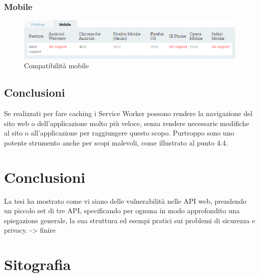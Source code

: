 \documentclass[11pt ,a4paper , twoside , openright ]{article}
\begin{document}
\subsubsection{Mobile}
\begin{figure}[h]
	\centering
	\includegraphics[width=1\linewidth]{CompMobile}
	\caption{Compatibilità mobile}
	\label{fig:Compatibilità mobile}
\end{figure}
\subsection{Conclusioni}
Se realizzati per fare caching i Service Worker possono rendere la navigazione del sito web o dell'applicazione molto più veloce, senza rendere necessarie modifiche al sito o all'applicazione per raggiungere questo scopo. 
Purtroppo sono uno potente strumento anche per scopi malevoli, come illustrato al punto 4.4.
\newpage
\cleardoublepage
\section{Conclusioni}
La tesi ha mostrato come vi siano delle vulnerabilità nelle API web, prendendo un piccolo set di tre API, specificando per ognuna in modo approfondito una spiegazione generale, la sua struttura ed esempi pratici sui problemi di sicurezza e privacy.
-> finire 

\cleardoublepage
\listoffigures
\cleardoublepage
\section{Sitografia}	

\end{document}
